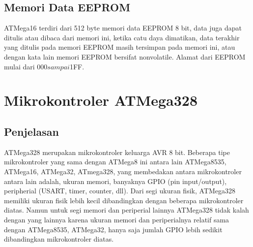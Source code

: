 	\subsection{Memori Data EEPROM}
		ATMega16 terdiri dari 512 byte memori data EEPROM 8 bit, data juga dapat ditulis atau dibaca dari memori ini, ketika catu daya dimatikan, data terakhir yang ditulis pada memori EEPROM masih tersimpan pada memori ini, atau dengan kata lain memori EEPROM bersifat nonvolatile.  Alamat dari EEPROM mulai dari $000 sampai $1FF.

\section{Mikrokontroler ATMega328}
	\subsection{Penjelasan}
	ATMega328 merupakan mikrokontroler keluarga AVR 8 bit. Beberapa tipe mikrokontroler yang sama dengan ATMega8 ini antara lain ATMega8535, ATMega16, ATMega32, ATmega328, yang membedakan antara mikrokontroler antara lain adalah, ukuran memori, banyaknya GPIO (pin input/output), peripherial (USART, timer, counter, dll). Dari segi ukuran fisik, ATMega328 memiliki ukuran fisik lebih kecil dibandingkan dengan beberapa mikrokontroler diatas. Namun untuk segi memori dan periperial lainnya ATMega328 tidak kalah dengan yang lainnya karena ukuran memori dan periperialnya relatif sama dengan ATMega8535, ATMega32, hanya saja jumlah GPIO lebih sedikit dibandingkan mikrokontroler diatas.

